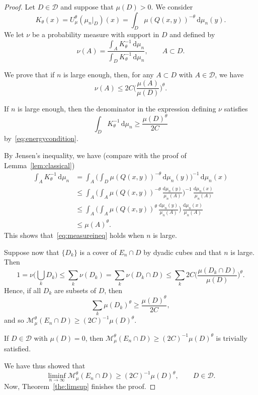 \documentclass[11pt]{article}
\theoremstyle{definition}
\numberwithin{equation}{section}
\numberwithin{figure}{section}
\numberwithin{table}{section}
\newcommand*{\dd}{\mathrm{d}}
\begin{document}
\begin{proof}
Let $D \in \mathscr{D}$ and suppose that $\mu (D) > 0$. We consider
\[
K_\theta (x) = U_\mu^\theta (\mu_n|_D) (x) = \int_D \mu (Q(x,y))^{-\theta} \, \dd \mu_n (y).
\]
We let $\nu$ be a probability measure with support in $D$ and defined by
\[
\nu (A) = \frac{\int_A K_\theta^{-1} \, \dd \mu_n}{\int_D K_\theta^{-1} \, \dd \mu_n}, \qquad A \subset D.
\]

We prove that if $n$ is large enough, then, for any $A \subset D$ with $A \in \mathscr{D}$, we have
\begin{equation}\label{eq:measureineq}
\nu (A) \leq 2 C \biggl(\frac{\mu (A)}{\mu (D)} \biggr)^\theta.
\end{equation}

If $n$ is large enough, then the denominator in the expression defining $\nu$ satisfies
\[
\int_D K_\theta^{-1} \, \dd \mu_n \geq
\frac{\mu(D)^\theta}{2C}
\]
by~\eqref{eq:energycondition}.

By Jensen's inequality, we have (compare with the proof of Lemma~\ref{lem:classical})
\begin{align*}
\int_A K_\theta^{-1} \, \dd \mu_n & = \int_A \biggl(\int_D
\mu (Q(x,y))^{-\theta} \, \dd \mu_n (y) \biggr)^{-1} \,
\dd \mu_n (x) \\ &\leq \int_A \biggl(\int_A \mu (Q(x,y))^{-\theta} \, \frac{\dd \mu_n (y)}{\mu_n (A)}
\biggr)^{-1} \, \frac{\dd \mu_n (x)}{\mu_n (A)} \\ &\leq
\int_A \biggl(\int_A \mu (Q(x,y))^{\theta} \, \frac{\dd
\mu_n (y)}{\mu_n (A)} \biggr) \, \frac{\dd \mu_n (x)}{\mu_n (A)} \\ &\leq \mu (A)^\theta.
\end{align*}
This shows that~\eqref{eq:measureineq} holds when $n$ is large.

Suppose now that $\{D_k\}$ is a cover of $E_n \cap D$ by dyadic cubes and that $n$ is large. Then
\[
1 = \nu \biggl(\bigcup_k D_k \biggr) \leq \sum_k \nu (D_k) = \sum_k
\nu (D_k \cap D) \leq \sum_k 2 C \biggl(\frac{\mu (D_k \cap D)}{\mu (D)} \biggr)^\theta.
\]
Hence, if all $D_k$ are subsets of $D$, then
\[
\sum_k \mu(D_k)^\theta \geq \frac{\mu (D)^\theta}{2 C},
\]
and so $\mathscr{M}_\mu^\theta (E_n \cap D) \geq (2C)^{-1} \mu (D)^\theta$.

If $D \in \mathscr{D}$ with $\mu (D) = 0$, then $\mathscr{M}_\mu^\theta (E_n \cap D) \geq (2C)^{-1} \mu (D)^\theta$ is trivially satisfied.

We have thus showed that
\[
\liminf_{n \to \infty} \mathscr{M}_\mu^\theta (E_n \cap D) \geq (2C)^{-1} \mu (D)^\theta, \qquad D \in \mathscr{D}.
\]
Now, Theorem~\ref{the:limsup} finishes the proof.
\end{proof}
\end{document}
